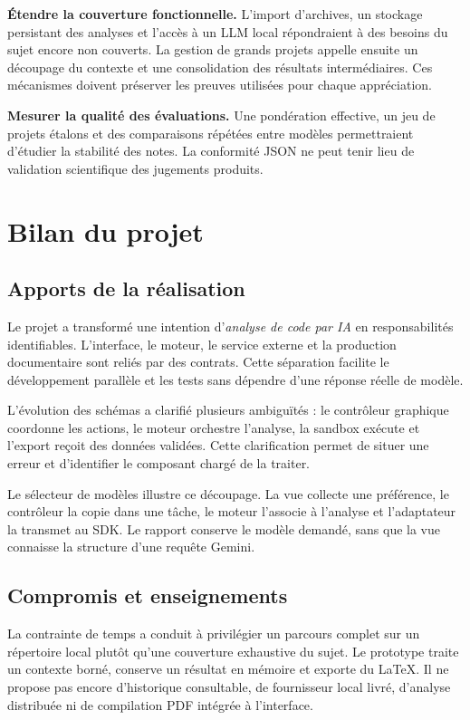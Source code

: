 \textbf{Étendre la couverture fonctionnelle.} L'import d'archives, un stockage persistant des analyses et l'accès à un LLM local répondraient à des besoins du sujet encore non couverts. La gestion de grands projets appelle ensuite un découpage du contexte et une consolidation des résultats intermédiaires. Ces mécanismes doivent préserver les preuves utilisées pour chaque appréciation.

\textbf{Mesurer la qualité des évaluations.} Une pondération effective, un jeu de projets étalons et des comparaisons répétées entre modèles permettraient d'étudier la stabilité des notes. La conformité JSON ne peut tenir lieu de validation scientifique des jugements produits.

\clearpage
\section{Bilan du projet}
\label{sec:bilan}
\subsection{Apports de la réalisation}
Le projet a transformé une intention d'\emph{analyse de code par IA} en responsabilités identifiables. L'interface, le moteur, le service externe et la production documentaire sont reliés par des contrats. Cette séparation facilite le développement parallèle et les tests sans dépendre d'une réponse réelle de modèle.

L'évolution des schémas a clarifié plusieurs ambiguïtés : le contrôleur graphique coordonne les actions, le moteur orchestre l'analyse, la sandbox exécute et l'export reçoit des données validées. Cette clarification permet de situer une erreur et d'identifier le composant chargé de la traiter.

Le sélecteur de modèles illustre ce découpage. La vue collecte une préférence, le contrôleur la copie dans une tâche, le moteur l'associe à l'analyse et l'adaptateur la transmet au SDK. Le rapport conserve le modèle demandé, sans que la vue connaisse la structure d'une requête Gemini.

\subsection{Compromis et enseignements}
La contrainte de temps a conduit à privilégier un parcours complet sur un répertoire local plutôt qu'une couverture exhaustive du sujet. Le prototype traite un contexte borné, conserve un résultat en mémoire et exporte du LaTeX. Il ne propose pas encore d'historique consultable, de fournisseur local livré, d'analyse distribuée ni de compilation PDF intégrée à l'interface.

